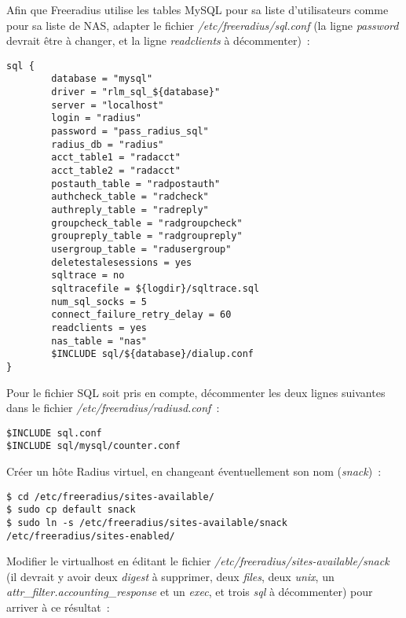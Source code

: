 Afin que Freeradius utilise les tables MySQL pour sa liste d'utilisateurs comme pour sa liste de NAS, adapter le fichier \emph{/etc/freeradius/sql.conf} (la ligne \emph{password} devrait être à changer, et la ligne \emph{readclients} à décommenter)~:
\begin{lstlisting}
sql {
        database = "mysql"
        driver = "rlm_sql_${database}"
        server = "localhost"
        login = "radius"
        password = "pass_radius_sql"
        radius_db = "radius"
        acct_table1 = "radacct"
        acct_table2 = "radacct"
        postauth_table = "radpostauth"
        authcheck_table = "radcheck"
        authreply_table = "radreply"
        groupcheck_table = "radgroupcheck"
        groupreply_table = "radgroupreply"
        usergroup_table = "radusergroup"
        deletestalesessions = yes
        sqltrace = no
        sqltracefile = ${logdir}/sqltrace.sql
        num_sql_socks = 5
        connect_failure_retry_delay = 60
        readclients = yes
        nas_table = "nas"
        $INCLUDE sql/${database}/dialup.conf
}
\end{lstlisting}

Pour le fichier SQL soit pris en compte, décommenter les deux lignes suivantes dans le fichier \emph{/etc/freeradius/radiusd.conf}~:

\begin{lstlisting}
$INCLUDE sql.conf
$INCLUDE sql/mysql/counter.conf
\end{lstlisting}

Créer un hôte Radius virtuel, en changeant éventuellement son nom (\emph{snack})~:

\begin{lstlisting}
$ cd /etc/freeradius/sites-available/
$ sudo cp default snack
$ sudo ln -s /etc/freeradius/sites-available/snack /etc/freeradius/sites-enabled/
\end{lstlisting}

Modifier le virtualhost en éditant le fichier \emph{/etc/freeradius/sites-available/snack} (il devrait y avoir deux \emph{digest} à supprimer, deux \emph{files}, deux \emph{unix}, un \emph{attr\_filter.accounting\_response} et un \emph{exec}, et trois \emph{sql} à décommenter) pour arriver à ce résultat~:

